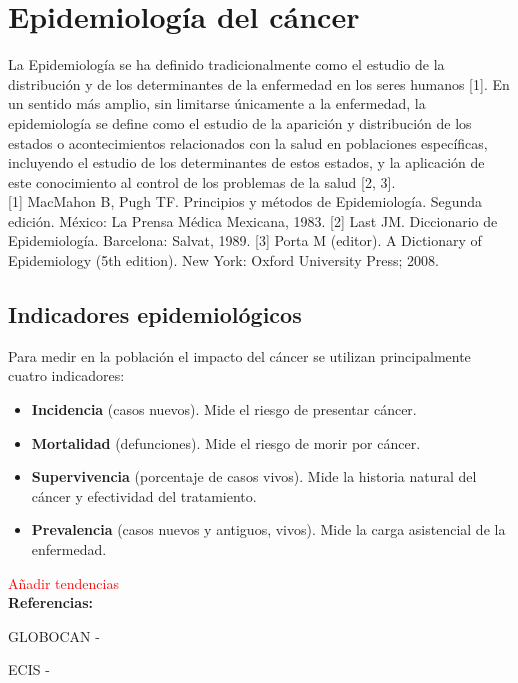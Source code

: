 \chapter{Epidemiología del cáncer}

La Epidemiología se ha definido tradicionalmente como el estudio de la distribución y de los determinantes de la enfermedad en los seres humanos [1]. En un sentido más amplio, sin limitarse únicamente a la enfermedad, la epidemiología se define como el estudio de la aparición y distribución de los estados o acontecimientos relacionados con la salud en poblaciones específicas, incluyendo el estudio de los determinantes de estos estados, y la aplicación de este conocimiento al control de los problemas de la salud [2, 3].\\

[1] MacMahon B, Pugh TF. Principios y métodos de Epidemiología. Segunda edición. México: La Prensa Médica Mexicana, 1983.
[2] Last JM. Diccionario de Epidemiología. Barcelona: Salvat, 1989.
[3] Porta M (editor). A Dictionary of Epidemiology (5th edition). New York: Oxford University Press; 2008.


\section{Indicadores epidemiológicos}

Para medir en la población el impacto del cáncer se utilizan principalmente cuatro indicadores:

\begin{itemize}
	\item \textbf{Incidencia} (casos nuevos). Mide el riesgo de presentar cáncer.
	\item \textbf{Mortalidad} (defunciones). Mide el riesgo de morir por cáncer.
	\item \textbf{Supervivencia} (porcentaje de casos vivos). Mide la historia natural del cáncer y efectividad del tratamiento.
	\item \textbf{Prevalencia} (casos nuevos y antiguos, vivos). Mide la carga asistencial de la enfermedad.
\end{itemize}

\textcolor{red}{Añadir tendencias}\\


\textbf{Referencias:}

GLOBOCAN - \cite{Bray2018, GCO}

ECIS - \cite{ECIS, ECIS2}

